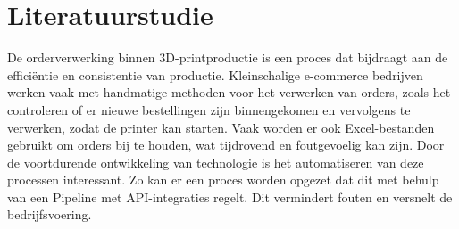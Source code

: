 






\section{Literatuurstudie}%
\label{sec:literatuurstudie}

De orderverwerking binnen 3D-printproductie is een proces dat bijdraagt aan de efficiëntie en consistentie van productie. Kleinschalige e-commerce bedrijven werken vaak met handmatige methoden voor het verwerken van orders, zoals het controleren of er  nieuwe bestellingen zijn binnengekomen en vervolgens te verwerken, zodat de printer kan starten. Vaak worden er ook Excel-bestanden gebruikt om orders bij te houden, wat tijdrovend en foutgevoelig kan zijn. Door de voortdurende ontwikkeling van technologie is het automatiseren van deze processen interessant. Zo kan er een proces worden opgezet dat dit met behulp van een Pipeline met API-integraties regelt. Dit vermindert fouten en versnelt de bedrijfsvoering. 

